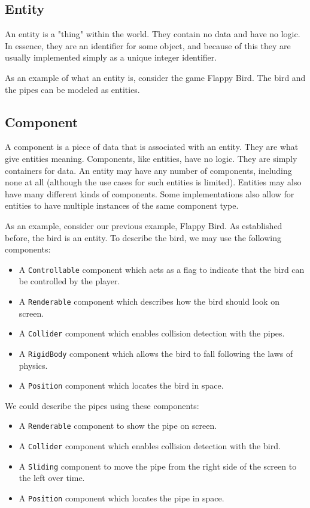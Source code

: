 \documentclass[conference]{IEEEtran}
\begin{document}
\subsection{Entity}
An entity is a "thing" within the world. They contain no data and have no logic. In essence, they are an identifier for some object, and because of this they are usually implemented simply as a unique integer identifier.

As an example of what an entity is, consider the game Flappy Bird. The bird and the pipes can be modeled as entities.

\subsection{Component}
A component is a piece of data that is associated with an entity. They are what give entities meaning. Components, like entities, have no logic. They are simply containers for data. An entity may have any number of components, including none at all (although the use cases for such entities is limited). Entities may also have many different kinds of components. Some implementations also allow for entities to have multiple instances of the same component type.


As an example, consider our previous example, Flappy Bird. As established before, the bird is an entity. To describe the bird, we may use the following components:
\begin{itemize}
\item A \verb|Controllable| component which acts as a flag to indicate that the bird can be controlled by the player.
\item A \verb|Renderable| component which describes how the bird should look on screen.
\item A \verb|Collider| component which enables collision detection with the pipes.
\item A \verb|RigidBody| component which allows the bird to fall following the laws of physics.
\item A \verb|Position| component which locates the bird in space.
\end{itemize}

We could describe the pipes using these components:
\begin{itemize}
\item A \verb|Renderable| component to show the pipe on screen.
\item A \verb|Collider| component which enables collision detection with the bird.
\item A \verb|Sliding| component to move the pipe from the right side of the screen to the left over time.
\item A \verb|Position| component which locates the pipe in space.
\end{itemize}
\end{document}
